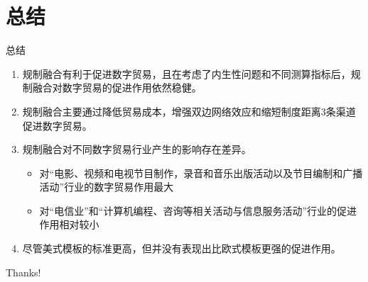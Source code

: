 \documentclass{beamer}
\begin{document}
\section{总结}
\begin{frame}{总结}
    \begin{enumerate}
        \item 规制融合有利于促进数字贸易，且在考虑了内生性问题和不同测算指标后，规制融合对数字贸易的促进作用依然稳健。
        \item 规制融合主要通过降低贸易成本，增强双边网络效应和缩短制度距离3条渠道促进数字贸易。
        \item 规制融合对不同数字贸易行业产生的影响存在差异。
        \begin{itemize}
            \item 对“电影、视频和电视节目制作，录音和音乐出版活动以及节目编制和广播活动”行业的数字贸易作用最大
            \item 对“电信业”和“计算机编程、咨询等相关活动与信息服务活动”行业的促进作用相对较小
        \end{itemize}
        \item 尽管美式模板的标准更高，但并没有表现出比欧式模板更强的促进作用。
    \end{enumerate}
\end{frame}

\begin{frame}
    \begin{center}
        {\Huge\calligra Thanks!}
    \end{center}
\end{frame}
\end{document}
